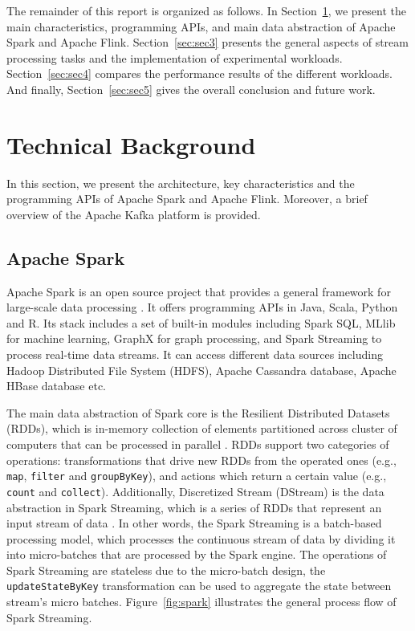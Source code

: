 \documentclass[]{article}
\begin{document}
\par The remainder of this report is organized as follows.
In Section~\ref{sec:sec2}, we present the main characteristics, programming APIs, and main data abstraction of Apache Spark and Apache Flink. Section~\ref{sec:sec3} presents the general aspects of stream processing tasks and the implementation of experimental workloads. Section~\ref{sec:sec4}
compares the performance results of the different workloads. And finally, Section~\ref{sec:sec5} gives the overall conclusion and future work.

\section{Technical Background}
\label{sec:sec2}
 In this section, we present the architecture, key characteristics and the programming APIs  of Apache Spark and Apache Flink. Moreover, a brief overview of the Apache Kafka platform is  provided.

\subsection{Apache Spark}

\par Apache Spark is an open source project that provides a general framework for large-scale data processing \cite{spark}. It offers programming APIs in Java, Scala, Python and R. Its stack includes a set of built-in modules including Spark SQL, MLlib for machine learning, GraphX for graph processing, and Spark Streaming to process real-time data streams. It can access different data sources including Hadoop Distributed File System (HDFS), Apache Cassandra database, Apache HBase database etc.

\par The main data abstraction of Spark core is the Resilient Distributed Datasets (RDDs), which is in-memory collection of elements partitioned across cluster of computers that can be processed in parallel \cite{rdd}. RDDs support two categories of operations: transformations that drive new RDDs from the operated ones (e.g., \texttt{map}, \texttt{filter} and \texttt{groupByKey}), and actions which return a certain value (e.g., \texttt{count} and \texttt{collect}). Additionally, Discretized Stream (DStream) is the data abstraction in Spark Streaming, which is a series of RDDs that represent an input stream of data \cite{spark_streaming}. In other words, the Spark Streaming is a batch-based processing model, which processes the continuous stream of data by dividing it into micro-batches that are  processed by the Spark engine. The operations of Spark Streaming are stateless due to the micro-batch design, the \texttt{updateStateByKey} transformation can be used to aggregate the state between stream's micro batches. Figure~\ref{fig:spark} illustrates the general process flow of Spark Streaming. 
\end{document}
